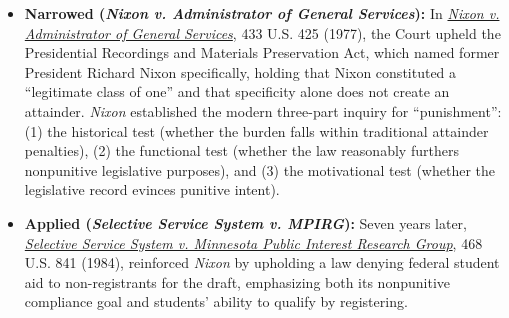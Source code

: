\documentclass[12pt]{article}
\begin{document}
\begin{itemize}

\item \textbf{Narrowed (\textit{Nixon v. Administrator of General Services}):} In \href{https://supreme.justia.com/cases/federal/us/433/425/}{\textit{Nixon v. Administrator of General Services}}, 433 U.S. 425 (1977), the Court upheld the Presidential Recordings and Materials Preservation Act, which named former President Richard Nixon specifically, holding that Nixon constituted a ``legitimate class of one'' and that specificity alone does not create an attainder. \textit{Nixon} established the modern three-part inquiry for ``punishment'': (1) the historical test (whether the burden falls within traditional attainder penalties), (2) the functional test (whether the law reasonably furthers nonpunitive legislative purposes), and (3) the motivational test (whether the legislative record evinces punitive intent).

\item \textbf{Applied (\textit{Selective Service System v. MPIRG}):} Seven years later, \href{https://supreme.justia.com/cases/federal/us/468/841/}{\textit{Selective Service System v. Minnesota Public Interest Research Group}}, 468 U.S. 841 (1984), reinforced \textit{Nixon} by upholding a law denying federal student aid to non-registrants for the draft, emphasizing both its nonpunitive compliance goal and students' ability to qualify by registering.

\end{itemize}
\end{document}
